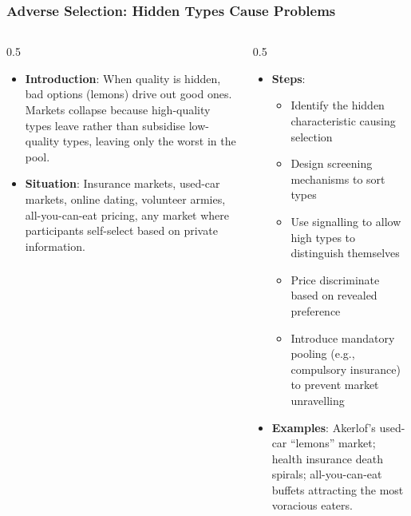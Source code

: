 \begin{frame}[fragile]\frametitle{Adverse Selection: Hidden Types Cause Problems}
\begin{columns}
    \begin{column}[T]{0.5\linewidth}
      \begin{itemize}
        \item \textbf{Introduction}: When quality is hidden, bad options (lemons) drive out good ones. Markets collapse because high-quality types leave rather than subsidise low-quality types, leaving only the worst in the pool.
        \item \textbf{Situation}: Insurance markets, used-car markets, online dating, volunteer armies, all-you-can-eat pricing, any market where participants self-select based on private information.
      \end{itemize}
    \end{column}
    \begin{column}[T]{0.5\linewidth}
      \begin{itemize}
        \item \textbf{Steps}:
        \begin{itemize}
          \item Identify the hidden characteristic causing selection
          \item Design screening mechanisms to sort types
          \item Use signalling to allow high types to distinguish themselves
          \item Price discriminate based on revealed preference
          \item Introduce mandatory pooling (e.g., compulsory insurance) to prevent market unravelling
        \end{itemize}\item \textbf{Examples}: Akerlof's used-car ``lemons'' market; health insurance death spirals; all-you-can-eat buffets attracting the most voracious eaters.
      \end{itemize}
    \end{column}
  \end{columns}
\end{frame}

